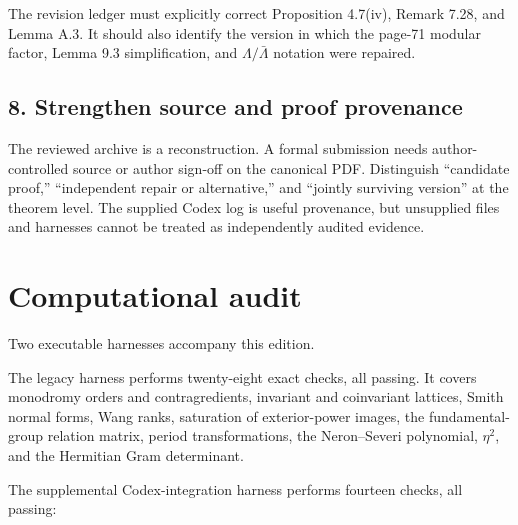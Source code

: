 \documentclass[
  10pt,
  letterpaper,
]{article}
\begin{document}
The revision ledger must explicitly correct Proposition 4.7(iv), Remark
7.28, and Lemma A.3. It should also identify the version in which the
page-71 modular factor, Lemma 9.3 simplification, and
\(\Lambda/\bar\Lambda\) notation were repaired.

\subsection{8. Strengthen source and proof
provenance}\label{strengthen-source-and-proof-provenance}

The reviewed archive is a reconstruction. A formal submission needs
author-controlled source or author sign-off on the canonical PDF.
Distinguish ``candidate proof,'' ``independent repair or alternative,''
and ``jointly surviving version'' at the theorem level. The supplied
Codex log is useful provenance, but unsupplied files and harnesses
cannot be treated as independently audited evidence.

\section{Computational audit}\label{computational-audit}

Two executable harnesses accompany this edition.

The legacy harness performs twenty-eight exact checks, all passing. It
covers monodromy orders and contragredients, invariant and coinvariant
lattices, Smith normal forms, Wang ranks, saturation of exterior-power
images, the fundamental-group relation matrix, period transformations,
the Neron--Severi polynomial, \(\eta^2\), and the Hermitian Gram
determinant.

The supplemental Codex-integration harness performs fourteen checks, all
passing:
\end{document}
